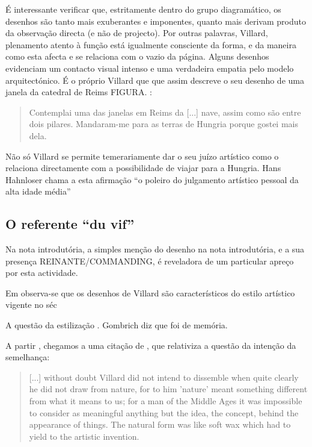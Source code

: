 \documentclass{article}
\begin{document}
É interessante verificar que, estritamente dentro do grupo
diagramático, os desenhos são tanto mais exuberantes e imponentes,
quanto mais derivam produto da observação directa (e não de
projecto). Por outras palavras, Villard, plenamento atento à função
está igualmente consciente da forma, e da maneira como esta afecta e
se relaciona com o vazio da página. Alguns desenhos evidenciam um
contacto visual intenso e uma verdadeira empatia pelo modelo
arquitectónico. É o próprio Villard que que assim descreve o seu
desenho de uma janela da catedral de Reims FIGURA. \cite{villard,
  p??}:

\begin{quote}
Contemplai uma das janelas em Reims da [...] nave, assim como são
entre dois pilares. Mandaram-me para as terras de Hungria porque
gostei mais dela. \cite{villard, p??}
\end{quote}

Não só Villard se permite temerariamente dar o seu juízo artístico
como o relaciona directamente com a possibilidade de viajar para a
Hungria. Hans Hahnloser \cite{hahnloser} chama a esta afirmação ``o
poleiro do julgamento artístico pessoal da alta idade média''

\subsection{O referente ``du vif''}

Na nota introdutória, a simples menção do desenho na nota
introdutória, e a sua presença REINANTE/COMMANDING, é reveladora de um
particular apreço por esta actividade.

Em \cite{teresa} observa-se que os desenhos de Villard são
característicos do estilo artístico vigente no séc

A questão da estilização \cite{gombrich}. Gombrich diz que foi de
memória.

A partir \cite{teresa}, chegamos a uma citação de \cite{schlosser},
que relativiza a questão da intenção da semelhança:

\begin{quote}
  [...] without doubt Villard did not intend to dissemble when quite
  clearly he did not draw from nature, for to him 'nature' meant
  something different from what it means to us; for a man of the
  Middle Ages it was impossible to consider as meaningful anything but
  the idea, the concept, behind the appearance of things. The natural
  form was like soft wax which had to yield to the artistic invention.
\end{quote}
\end{document}
